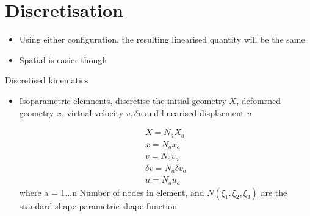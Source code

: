 




	\section{Discretisation}

	\begin{frame}
		\begin{itemize}
			\item Using either configuration, the resulting linearised quantity will be the same
			\item Spatial is easier though
			
		\end{itemize}
	\end{frame}


	\begin{frame}{Discretised kinematics}
		\begin{itemize}
			\item Isoparametric elemnents, discretise the initial geometry $X$, defomrned geometry $x$, virtual velocity $v, \delta v$ and linearised displacment $u$
			
			\begin{equation}
				\begin{aligned}
				X = N_aX_a\\
				x = N_ax_a\\
				v =  N_av_a\\
				\delta v = N_a \delta v_a\\
				u = N_a u_a
				\end{aligned}
			\end{equation}
			where a = 1...n Number of nodes in element, and $N(\xi_1,\xi_2,\xi_3)$ are the standard shape parametric shape function
		\end{itemize}
	\end{frame}


